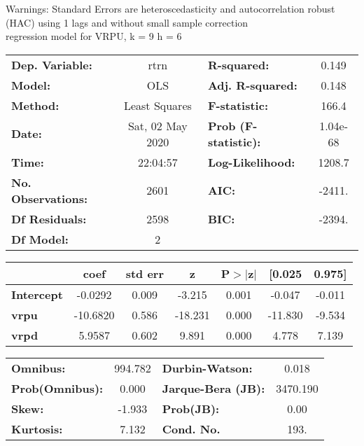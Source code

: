 Warnings: \newline
 [1] Standard Errors are heteroscedasticity and autocorrelation robust (HAC) using 1 lags and without small sample correction\\ 

regression model for VRPU, k = 9 h = 6\begin{center}
\begin{tabular}{lclc}
\toprule
\textbf{Dep. Variable:}    &       rtrn       & \textbf{  R-squared:         } &     0.149   \\
\textbf{Model:}            &       OLS        & \textbf{  Adj. R-squared:    } &     0.148   \\
\textbf{Method:}           &  Least Squares   & \textbf{  F-statistic:       } &     166.4   \\
\textbf{Date:}             & Sat, 02 May 2020 & \textbf{  Prob (F-statistic):} &  1.04e-68   \\
\textbf{Time:}             &     22:04:57     & \textbf{  Log-Likelihood:    } &    1208.7   \\
\textbf{No. Observations:} &        2601      & \textbf{  AIC:               } &    -2411.   \\
\textbf{Df Residuals:}     &        2598      & \textbf{  BIC:               } &    -2394.   \\
\textbf{Df Model:}         &           2      & \textbf{                     } &             \\
\bottomrule
\end{tabular}
\begin{tabular}{lcccccc}
                   & \textbf{coef} & \textbf{std err} & \textbf{z} & \textbf{P$> |$z$|$} & \textbf{[0.025} & \textbf{0.975]}  \\
\midrule
\textbf{Intercept} &      -0.0292  &        0.009     &    -3.215  &         0.001        &       -0.047    &       -0.011     \\
\textbf{vrpu}      &     -10.6820  &        0.586     &   -18.231  &         0.000        &      -11.830    &       -9.534     \\
\textbf{vrpd}      &       5.9587  &        0.602     &     9.891  &         0.000        &        4.778    &        7.139     \\
\bottomrule
\end{tabular}
\begin{tabular}{lclc}
\textbf{Omnibus:}       & 994.782 & \textbf{  Durbin-Watson:     } &    0.018  \\
\textbf{Prob(Omnibus):} &   0.000 & \textbf{  Jarque-Bera (JB):  } & 3470.190  \\
\textbf{Skew:}          &  -1.933 & \textbf{  Prob(JB):          } &     0.00  \\
\textbf{Kurtosis:}      &   7.132 & \textbf{  Cond. No.          } &     193.  \\
\bottomrule
\end{tabular}
\end{center}

